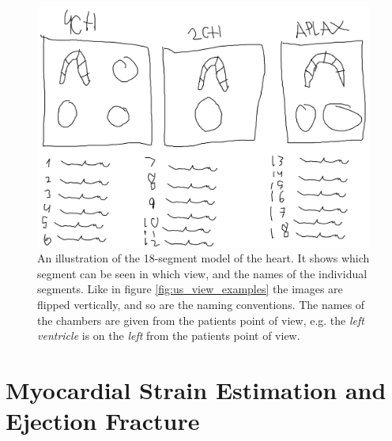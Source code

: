 \begin{figure}[H]
    \centering
    \includegraphics[width=0.99\textwidth]{echocardiography/18_segment_model.png}
    \caption{An illustration of the 18-segment model of the heart. It shows which segment can be seen in which view, and the names of the individual segments. Like in figure \ref{fig:us_view_examples} the images are flipped vertically, and so are the naming conventions. The names of the chambers are given from the patients point of view, e.g. the \textit{left ventricle} is on the \textit{left} from the patients point of view.}
    \label{fig:18_segment_model}
\end{figure}

\section{Myocardial Strain Estimation and Ejection Fracture}

